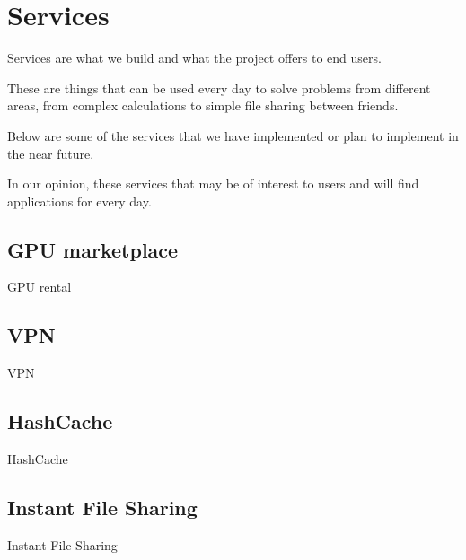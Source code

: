 \section{Services}

Services are what we build and what the project offers to end users.

These are things that can be used every day to solve problems from different areas, from complex calculations to simple file sharing between friends.

Below are some of the services that we have implemented or plan to implement in the near future.

In our opinion, these services that may be of interest to users and will find applications for every day.

\subsection{GPU marketplace}

GPU rental

\subsection{VPN}

VPN

\subsection{HashCache}

HashCache

\subsection{Instant File Sharing}

Instant File Sharing
